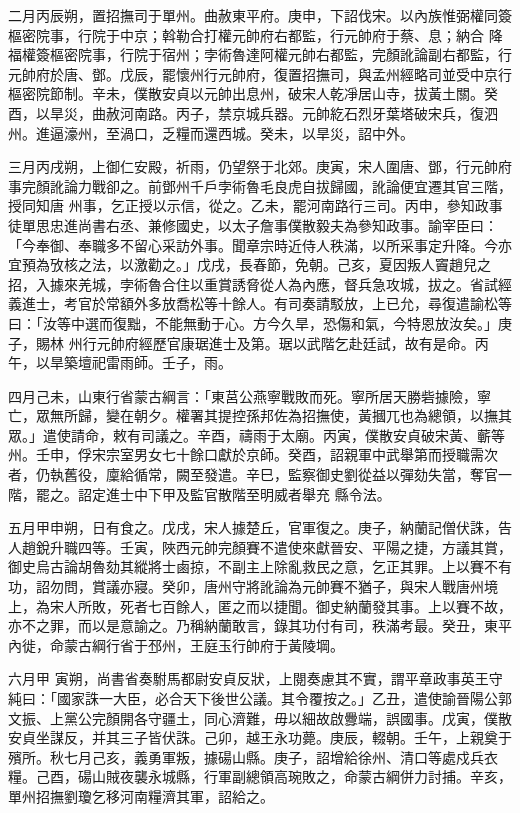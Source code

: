 \begin{pinyinscope}
 二月丙辰朔，置招撫司于單州。曲赦東平府。庚申，下詔伐宋。以內族惟弼權同簽樞密院事，行院于中京；斡勒合打權元帥府右都監，行元帥府于蔡、息；納合
 降福權簽樞密院事，行院于宿州；孛術魯達阿權元帥右都監，完顏訛論副右都監，行元帥府於唐、鄧。戊辰，罷懷州行元帥府，復置招撫司，與孟州經略司並受中京行樞密院節制。辛未，僕散安貞以元帥出息州，破宋人乾凈居山寺，拔黃土關。癸酉，以旱災，曲赦河南路。丙子，禁京城兵器。元帥紇石烈牙葉塔破宋兵，復泗州。進逼濠州，至渦口，乏糧而還西城。癸未，以旱災，詔中外。



 三月丙戌朔，上御仁安殿，祈雨，仍望祭于北郊。庚寅，宋人圍唐、鄧，行元帥府事完顏訛論力戰卻之。前鄧州千戶孛術魯毛良虎自拔歸國，訛論便宜遷其官三階，授同知唐
 州事，乞正授以示信，從之。乙未，罷河南路行三司。丙申，參知政事徒單思忠進尚書右丞、兼修國史，以太子詹事僕散毅夫為參知政事。諭宰臣曰：「今奉御、奉職多不留心采訪外事。聞章宗時近侍人秩滿，以所采事定升降。今亦宜預為攷核之法，以激勸之。」戊戌，長春節，免朝。己亥，夏因叛人竇趙兒之招，入據來羌城，孛術魯合住以重賞誘脅從人為內應，督兵急攻城，拔之。省試經義進士，考官於常額外多放喬松等十餘人。有司奏請駁放，上已允，尋復遣諭松等曰：「汝等中選而復黜，不能無動于心。方今久旱，恐傷和氣，今特恩放汝矣。」庚子，賜林
 州行元帥府經歷官康琚進士及第。琚以武階乞赴廷試，故有是命。丙午，以旱築壇祀雷雨師。壬子，雨。



 四月己未，山東行省蒙古綱言：「東莒公燕寧戰敗而死。寧所居天勝砦據險，寧亡，眾無所歸，變在朝夕。權署其提控孫邦佐為招撫使，黃摑兀也為總領，以撫其眾。」遣使請命，敕有司議之。辛酉，禱雨于太廟。丙寅，僕散安貞破宋黃、蘄等州。壬申，俘宋宗室男女七十餘口獻於京師。癸酉，詔親軍中武舉第而授職需次者，仍執舊役，廩給循常，闕至發遣。辛巳，監察御史劉從益以彈劾失當，奪官一階，罷之。詔定進士中下甲及監官散階至明威者舉充
 縣令法。



 五月甲申朔，日有食之。戊戌，宋人據楚丘，官軍復之。庚子，納蘭記僧伏誅，告人趙銳升職四等。壬寅，陜西元帥完顏賽不遣使來獻晉安、平陽之捷，方議其賞，御史烏古論胡魯劾其縱將士鹵掠，不副主上除亂救民之意，乞正其罪。上以賽不有功，詔勿問，賞議亦寢。癸卯，唐州守將訛論為元帥賽不猶子，與宋人戰唐州境上，為宋人所敗，死者七百餘人，匿之而以捷聞。御史納蘭發其事。上以賽不故，亦不之罪，而以是意諭之。乃稱納蘭敢言，錄其功付有司，秩滿考最。癸丑，東平內徙，命蒙古綱行省于邳州，王庭玉行帥府于黃陵堈。



 六月甲
 寅朔，尚書省奏駙馬都尉安貞反狀，上閱奏慮其不實，謂平章政事英王守純曰：「國家誅一大臣，必合天下後世公議。其令覆按之。」乙丑，遣使諭晉陽公郭文振、上黨公完顏開各守疆土，同心濟難，毋以細故啟釁端，誤國事。戊寅，僕散安貞坐謀反，并其三子皆伏誅。己卯，越王永功薨。庚辰，輟朝。壬午，上親奠于殯所。秋七月己亥，義勇軍叛，據碭山縣。庚子，詔增給徐州、清口等處戍兵衣糧。己酉，碭山賊夜襲永城縣，行軍副總領高琬敗之，命蒙古綱併力討捕。辛亥，單州招撫劉瓊乞移河南糧濟其軍，詔給之。




\end{pinyinscope}
